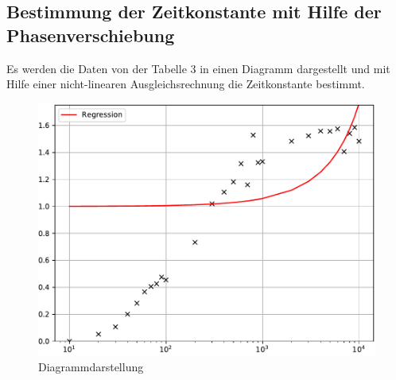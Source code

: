 \subsection{Bestimmung der Zeitkonstante mit Hilfe der Phasenverschiebung}
Es werden die Daten von der Tabelle 3 in einen Diagramm dargestellt und mit Hilfe
einer nicht-linearen Ausgleichsrechnung die Zeitkonstante bestimmt.

\begin{figure}[H]
  \centering
  \includegraphics[width=\textwidth]{Diagramm3.pdf}
  \caption{Diagrammdarstellung}
  \label{fig:3}
\end{figure}

